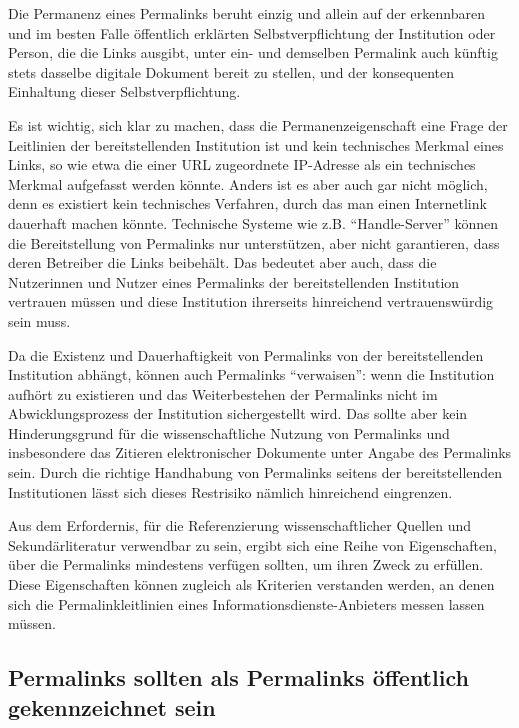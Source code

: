 \documentclass[12pt, a4paper]{article}
\begin{document}
Die Permanenz eines Permalinks beruht einzig und allein auf der
erkennbaren und im besten Falle öffentlich erklärten
Selbstverpflichtung der Institution oder Person, die die Links
ausgibt, unter ein- und demselben Permalink auch künftig stets
dasselbe digitale Dokument bereit zu stellen, und der konsequenten
Einhaltung dieser Selbstverpflichtung.

Es ist wichtig, sich klar zu machen, dass die Permanenzeigenschaft
eine Frage der Leitlinien der bereitstellenden Institution ist und
kein technisches Merkmal eines Links, so wie etwa die einer URL
zugeordnete IP-Adresse als ein technisches Merkmal aufgefasst werden
könnte. Anders ist es aber auch gar nicht möglich, denn es existiert
kein technisches Verfahren, durch das man einen Internetlink dauerhaft
machen könnte.
Technische Systeme wie z.B. "`Handle-Server"' können die
Bereitstellung von Permalinks nur unterstützen, aber nicht
garantieren, dass deren Betreiber die Links beibehält. Das bedeutet
aber auch, dass die Nutzerinnen und Nutzer eines Permalinks der
bereitstellenden Institution vertrauen müssen und diese Institution
ihrerseits hinreichend vertrauenswürdig sein muss.

Da die Existenz und Dauerhaftigkeit von Permalinks von der
bereitstellenden Institution abhängt, können auch Permalinks
"`verwaisen"': wenn die Institution aufhört zu existieren und das
Weiterbestehen der Permalinks nicht im Abwicklungsprozess der
Institution sichergestellt wird. Das sollte aber kein Hinderungsgrund
für die wissenschaftliche Nutzung von Permalinks und insbesondere das
Zitieren elektronischer Dokumente unter Angabe des Permalinks sein.
Durch die richtige Handhabung von Permalinks seitens der
bereitstellenden Institutionen lässt sich dieses Restrisiko nämlich
hinreichend eingrenzen.

\label{wesentliche-eigenschaften-von-permalinks}
Aus dem Erfordernis, für die Referenzierung wissenschaftlicher Quellen
und Sekundärliteratur verwendbar zu sein, ergibt sich eine Reihe von
Eigenschaften, über die Permalinks mindestens verfügen sollten, um
ihren Zweck zu erfüllen. Diese Eigenschaften können zugleich als
Kriterien verstanden werden, an denen sich die Permalinkleitlinien
eines Informationsdienste-Anbieters messen lassen müssen.

\subsection{Permalinks sollten als Permalinks öffentlich
  gekennzeichnet sein}
\label{permalinks-sollten-als-permalinks-oeffentlich-gekennzeichnet-sein}
\end{document}
